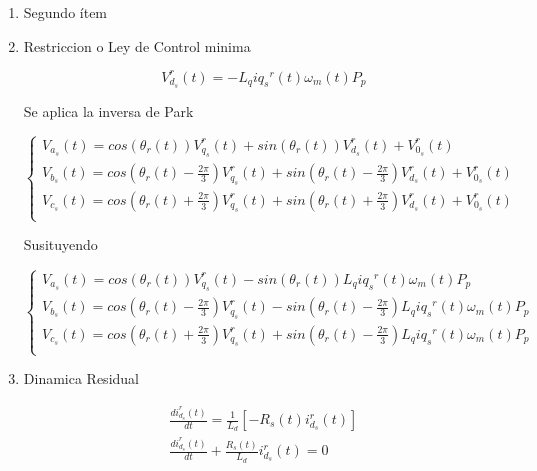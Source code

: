 \documentclass{article}
\begin{document}
\begin{enumerate}[label=\roman*.]
    \item Segundo ítem
    
    
    
    \item Restriccion o Ley de Control minima

    \begin{equation}
        V_{d_{s}}^r(t) = -L_{q}i{q_{s}}^r(t)\omega_{m}(t)P_{p}
    \end{equation}

    Se aplica la inversa de Park

    \begin{equation}
        \begin{cases}
            V_{a_{s}}(t) = cos(\theta_{r}(t))V_{q_{s}}^r(t) + sin(\theta_{r}(t))V_{d_{s}}^r(t) + V_{0_{s}}^r(t)\\
            V_{b_{s}}(t) = cos(\theta_{r}(t) - \frac{2\pi}{3})V_{q_{s}}^r(t) + sin(\theta_{r}(t) - \frac{2\pi}{3})V_{d_{s}}^r(t) + V_{0_{s}}^r(t)\\
            V_{c_{s}}(t) = cos(\theta_{r}(t) + \frac{2\pi}{3})V_{q_{s}}^r(t) + sin(\theta_{r}(t) + \frac{2\pi}{3})V_{d_{s}}^r(t) + V_{0_{s}}^r(t)\\
        \end{cases}
    \end{equation}

    Susituyendo

    \begin{equation}
        \begin{cases}
            V_{a_{s}}(t) = cos(\theta_{r}(t))V_{q_{s}}^r(t) - sin(\theta_{r}(t))L_{q}i{q_{s}}^r(t)\omega_{m}(t)P_{p}\\
            V_{b_{s}}(t) = cos(\theta_{r}(t) - \frac{2\pi}{3})V_{q_{s}}^r(t) - sin(\theta_{r}(t) - \frac{2\pi}{3})L_{q}i{q_{s}}^r(t)\omega_{m}(t)P_{p}\\
            V_{c_{s}}(t) = cos(\theta_{r}(t) + \frac{2\pi}{3})V_{q_{s}}^r(t) + sin(\theta_{r}(t) - \frac{2\pi}{3})L_{q}i{q_{s}}^r(t)\omega_{m}(t)P_{p}\\
        \end{cases}
    \end{equation}

    \item Dinamica Residual
    
    \begin{equation}
        \begin{aligned}
        \frac{di_{d_{s}}^r(t)}{dt} = \frac{1}{L_{d}}[-R_{s}(t)i_{d_{s}}^r(t)] \\
        \frac{di_{d_{s}}^r(t)}{dt} + \frac{R_{s}(t)}{L_{d}}i_{d_{s}}^r(t) = 0 \\
        \end{aligned}
    \end{equation} 


\end{enumerate}
\end{document}
